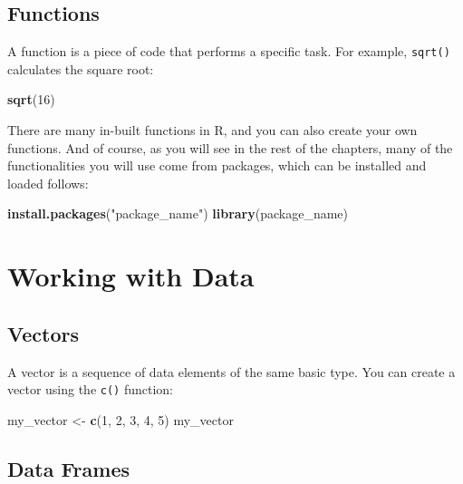 \documentclass[
]{book}
\newenvironment{Shaded}{\begin{snugshade}}{\end{snugshade}}
\newcommand{\DecValTok}[1]{\textcolor[rgb]{0.00,0.00,0.81}{#1}}
\newcommand{\FunctionTok}[1]{\textcolor[rgb]{0.13,0.29,0.53}{\textbf{#1}}}
\newcommand{\NormalTok}[1]{#1}
\newcommand{\OtherTok}[1]{\textcolor[rgb]{0.56,0.35,0.01}{#1}}
\newcommand{\StringTok}[1]{\textcolor[rgb]{0.31,0.60,0.02}{#1}}
\begin{document}
\subsection{Functions}\label{functions}

A function is a piece of code that performs a specific task. For example, \texttt{sqrt()} calculates the square root:

\begin{Shaded}
\begin{Highlighting}[]
\FunctionTok{sqrt}\NormalTok{(}\DecValTok{16}\NormalTok{)}
\end{Highlighting}
\end{Shaded}

There are many in-built functions in R, and you can also create your own functions. And of course, as you will see in the rest of the chapters, many of the functionalities you will use come from packages, which can be installed and loaded follows:

\begin{Shaded}
\begin{Highlighting}[]
\FunctionTok{install.packages}\NormalTok{(}\StringTok{"package\_name"}\NormalTok{)}
\FunctionTok{library}\NormalTok{(package\_name)}
\end{Highlighting}
\end{Shaded}

\section{Working with Data}\label{working-with-data}

\subsection{Vectors}\label{vectors}

A vector is a sequence of data elements of the same basic type. You can create a vector using the \texttt{c()} function:

\begin{Shaded}
\begin{Highlighting}[]
\NormalTok{my\_vector }\OtherTok{\textless{}{-}} \FunctionTok{c}\NormalTok{(}\DecValTok{1}\NormalTok{, }\DecValTok{2}\NormalTok{, }\DecValTok{3}\NormalTok{, }\DecValTok{4}\NormalTok{, }\DecValTok{5}\NormalTok{)}
\NormalTok{my\_vector}
\end{Highlighting}
\end{Shaded}

\subsection{Data Frames}\label{data-frames}
\end{document}
